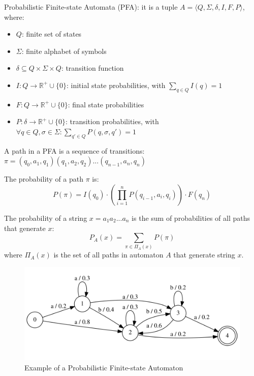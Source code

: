 Probabilistic Finite-state Automata (PFA): it is a tuple
$A = \langle Q, \Sigma, \delta, I, F , P\rangle $, where:


\begin{itemize}
   \item $Q$: finite set of states
   \item $\Sigma$: finite alphabet of symbols
   \item $\delta \subseteq Q \times \Sigma \times Q$: transition function
   \item $I: Q \rightarrow \mathbb{R}^+ \cup \{0\}$: initial state probabilities, with $\sum_{q \in Q} I(q) = 1$
   \item $F: Q \rightarrow \mathbb{R}^+ \cup \{0\}$: final state probabilities
   \item $P: \delta \rightarrow \mathbb{R}^+ \cup \{0\}$: transition probabilities, with $\forall q \in Q, \sigma \in \Sigma: \sum_{q' \in Q} P(q,\sigma,q') = 1$
\end{itemize}

A path in a PFA is a sequence of transitions: $\pi = (q_0, a_1, q_1)(q_1, a_2, q_2)...(q_{n-1}, a_n, q_n)$

The probability of a path $\pi$ is:
\begin{equation}
P(\pi) = I(q_0) \cdot \left(\prod_{i=1}^{n} P(q_{i-1}, a_i, q_i)\right) \cdot F(q_n)
\end{equation}

The probability of a string $x = a_1a_2...a_n$ is the sum of probabilities of all paths that generate $x$:
\begin{equation}
P_A(x) = \sum_{\pi \in \Pi_A(x)} P(\pi)
\end{equation}
where $\Pi_A(x)$ is the set of all paths in automaton $A$ that generate string $x$.

\begin{figure}[htbp]
   \centering
   \includegraphics{images/07/pfaExample.png}
   \caption{Example of a Probabilistic Finite-state Automaton}
   \label{fig:07/pfaExample}
\end{figure}

